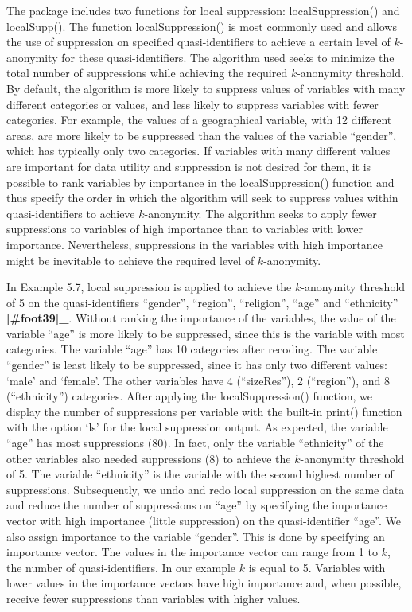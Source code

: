 \documentclass[letterpaper,10pt,english]{sphinxmanual}
\begin{document}
The  package includes two functions for local suppression:
localSuppression() and localSupp(). The function localSuppression() is
most commonly used and allows the use of suppression on specified
quasi-identifiers to achieve a certain level of \(k\)-anonymity for
these quasi-identifiers. The algorithm used seeks to minimize the total
number of suppressions while achieving the required \(k\)-anonymity
threshold. By default, the algorithm is more likely to suppress values
of variables with many different categories or values, and less likely
to suppress variables with fewer categories. For example, the values of
a geographical variable, with 12 different areas, are more likely to be
suppressed than the values of the variable “gender”, which has typically
only two categories. If variables with many different values are
important for data utility and suppression is not desired for them, it
is possible to rank variables by importance in the localSuppression()
function and thus specify the order in which the algorithm will seek to
suppress values within quasi-identifiers to achieve \(k\)-anonymity.
The algorithm seeks to apply fewer suppressions to variables of high
importance than to variables with lower importance. Nevertheless,
suppressions in the variables with high importance might be inevitable
to achieve the required level of \(k\)-anonymity.

In Example 5.7, local suppression is applied to achieve the
\(k\)-anonymity threshold of 5 on the quasi-identifiers “gender”,
“region”, “religion”, “age” and “ethnicity” {\color{red}\bfseries{}{[}\#foot39{]}\_}.
Without ranking the importance of the variables, the value of the
variable “age” is more likely to be suppressed, since this is the
variable with most categories. The variable “age” has 10 categories
after recoding. The variable “gender” is least likely to be suppressed,
since it has only two different values: ‘male’ and ‘female’. The other
variables have 4 (“sizeRes”), 2 (“region”), and 8 (“ethnicity”)
categories. After applying the localSuppression() function, we display
the number of suppressions per variable with the built-in print()
function with the option ‘ls’ for the local suppression output. As
expected, the variable “age” has most suppressions (80). In fact, only
the variable “ethnicity” of the other variables also needed suppressions
(8) to achieve the \(k\)-anonymity threshold of 5. The variable
“ethnicity” is the variable with the second highest number of
suppressions. Subsequently, we undo and redo local suppression on the
same data and reduce the number of suppressions on “age” by specifying
the importance vector with high importance (little suppression) on the
quasi-identifier “age”. We also assign importance to the variable
“gender”. This is done by specifying an importance vector. The values in
the importance vector can range from 1 to \(k\), the number of
quasi-identifiers. In our example \(k\) is equal to 5. Variables
with lower values in the importance vectors have high importance and,
when possible, receive fewer suppressions than variables with higher
values.
\end{document}
